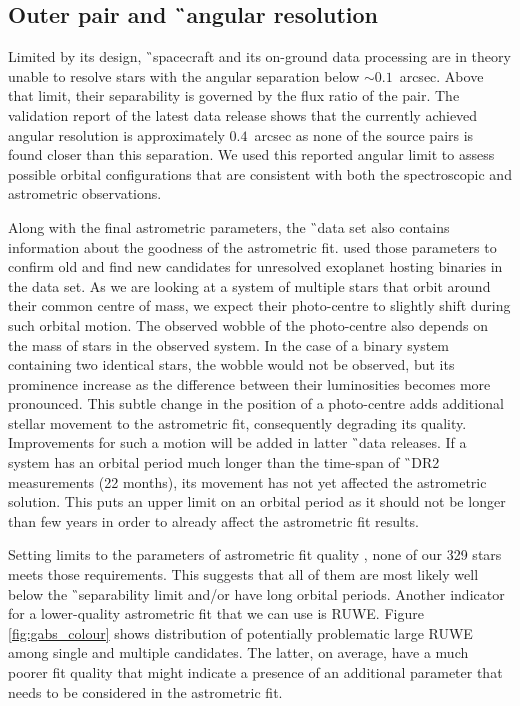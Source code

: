 \subsection{Outer pair and \G\ angular resolution}
\label{sec:orbits_gaia}
Limited by its design, \G\ spacecraft and its on-ground data processing are in theory unable to resolve stars with the angular separation below $\sim0.1$~arcsec. Above that limit, their separability is governed by the flux ratio of the pair. The validation report of the latest data release \citep{2018A&A...616A..17A} shows that the currently achieved angular resolution is approximately $0.4$~arcsec as none of the source pairs is found closer than this separation. We used this reported angular limit to assess possible orbital configurations that are consistent with both the spectroscopic and astrometric observations.

Along with the final astrometric parameters, the \G\ data set also contains information about the goodness of the astrometric fit. \citet{2018RNAAS...2b..20E} used those parameters to confirm old and find new candidates for unresolved exoplanet hosting binaries in the data set. As we are looking at a system of multiple stars that orbit around their common centre of mass, we expect their photo-centre to slightly shift during such orbital motion. The observed wobble of the photo-centre also depends on the mass of stars in the observed system. In the case of a binary system containing two identical stars, the wobble would not be observed, but its prominence increase as the difference between their luminosities becomes more pronounced. This subtle change in the position of a photo-centre adds additional stellar movement to the astrometric fit, consequently degrading its quality. Improvements for such a motion will be added in latter \G\ data releases. If a system has an orbital period much longer than the time-span of \G\ DR2 measurements (22 months), its movement has not yet affected the astrometric solution. This puts an upper limit on an orbital period as it should not be longer than few years in order to already affect the astrometric fit results. 

Setting limits to the parameters of astrometric fit quality \citep[\texttt{astrometric\_excess\_noise}~>~5, and \texttt{astrometric\_gof\_al}~>~20 as proposed by][]{2018RNAAS...2b..20E}, none of our 329 stars meets those requirements. This suggests that all of them are most likely well below the \G\ separability limit and/or have long orbital periods. Another indicator for a lower-quality astrometric fit that we can use is RUWE. Figure \ref{fig:gabs_colour} shows distribution of potentially problematic large RUWE among single and multiple candidates. The latter, on average, have a much poorer fit quality that might indicate a presence of an additional parameter that needs to be considered in the astrometric fit. 

